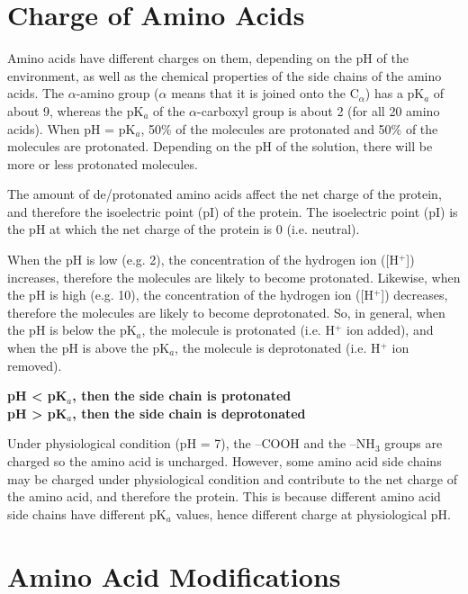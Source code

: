 \documentclass[a4paper, 12pt]{report}
\begin{document}
\section{Charge of Amino Acids}

Amino acids have different charges on them, depending on the pH of the environment, as well as the chemical properties of the side chains of the amino acids.
The $\alpha$-amino group ($\alpha$ means that it is joined onto the C$_{\alpha}$) has a pK$_a$ of about 9, whereas the pK$_a$ of the $\alpha$-carboxyl group is about 2 (for all 20 amino acids).
When pH = pK$_a$, 50\% of the molecules are protonated and 50\% of the molecules are protonated.
Depending on the pH of the solution, there will be more or less protonated molecules.

The amount of de/protonated amino acids affect the net charge of the protein, and therefore the isoelectric point (pI) of the protein.
The isoelectric point (pI) is the pH at which the net charge of the protein is 0 (i.e. neutral).

When the pH is low (e.g. 2), the concentration of the hydrogen ion ([H$^+$]) increases, therefore the molecules are likely to become protonated.
Likewise, when the pH is high (e.g. 10), the concentration of the hydrogen ion ([H$^+$]) decreases, therefore the molecules are likely to become deprotonated.
So, in general, when the pH is below the pK$_a$, the molecule is protonated (i.e. H$^+$ ion added), and when the pH is above the pK$_a$, the molecule is deprotonated (i.e. H$^+$ ion removed).

\begin{center}
    \textbf
        {pH \textless{} pK$_a$, then the side chain is protonated \\
        pH \textgreater{} pK$_a$, then the side chain is deprotonated}
\end{center}

Under physiological condition (pH = 7), the --COOH and the --NH$_3$ groups are charged so the amino acid is uncharged.
However, some amino acid side chains may be charged under physiological condition and contribute to the net charge of the amino acid, and therefore the protein.
This is because different amino acid side chains have different pK$_a$ values, hence different charge at physiological pH.

\section{Amino Acid Modifications}
\end{document}

